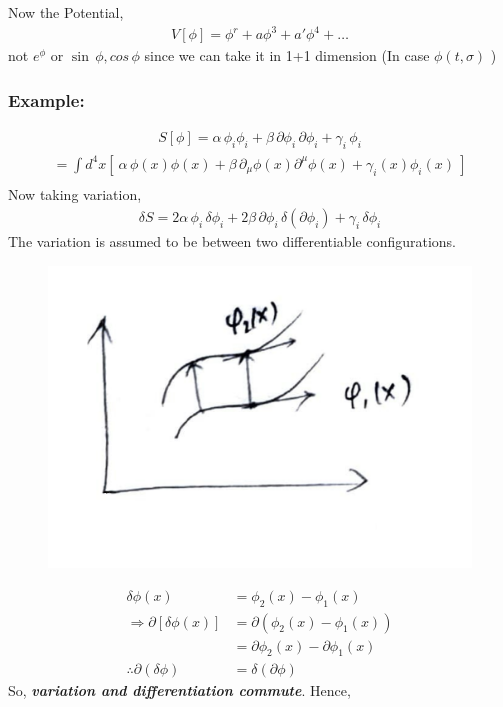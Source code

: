 \documentclass[14pt]{article} %
\begin{document}
Now the Potential,
\begin{align*}
V[\phi] = \phi^r + a \phi^3 + a' \phi^4 + \dots
\end{align*}
not  $e^\phi$ or $\sin\, \phi, cos\,\phi$ since we can take it in 1+1 dimension (In case $\phi(t, \sigma)$ )
\subsubsection*{Example:}
\begin{align*}
S[\phi] = \alpha\, \phi_i \phi_i + \beta\, \partial \phi_i \, \partial \phi_i + \gamma_i\, \phi_i
\end{align*}
\begin{align*}
= \int d^4x \left[~ \alpha \, \phi(x)\phi(x) + \beta \, \partial_\mu \phi(x) \partial^\mu \phi(x) + \gamma_i(x) \phi_i(x) ~\right]
\end{align*}
\begin{align*}
[ \text{looking at this, it is too cumbersome without the DeWitt notation} ]
\end{align*}
Now taking variation,
\begin{align*}
\delta S = 2\alpha\, \phi_i\, \delta \phi_i + 2\beta \, \partial \phi_i \, \delta(\partial \phi_i) + \gamma_i \,\delta \phi_i
\end{align*}
The variation is assumed to be between two differentiable configurations.
\begin{figure}[H]
    \centering
    \includegraphics[width=0.4\linewidth]{L5_3.jpeg}
    \caption*{}
\end{figure}
\vspace{-1.5cm}
\begin{align*}
\delta \phi(x) &= \phi_2(x) - \phi_1(x) \\
\Rightarrow \partial \left[ \delta \phi(x) \right] &= \partial (\phi_2(x) - \phi_1(x)) \\
&= \partial \phi_2(x) - \partial \phi_1(x) \\ 
\therefore \partial(\delta \phi) &= \delta (\partial \phi)
\end{align*}
So, \textbf{\textit{variation and differentiation commute}}. Hence,
\end{document}
